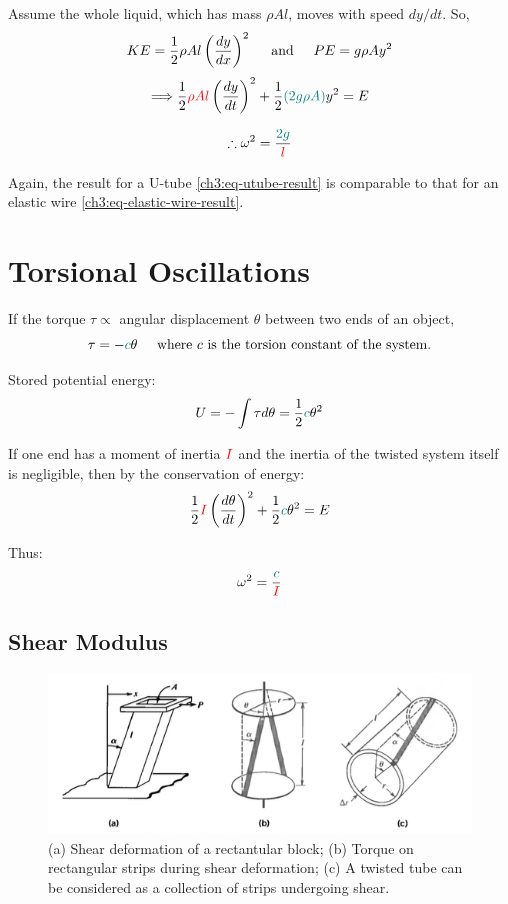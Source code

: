 Assume the whole liquid, which has mass $\rho Al$, moves with speed $dy/dt$. So,
\[ KE = \frac{1}{2} \rho Al \left(\frac{dy}{dx}\right)^2 \hspace{0.5cm}\text{and}\hspace{0.5cm}
PE = g\rho Ay^2 \]
\[ \Longrightarrow \frac{1}{2} \textcolor{red}{\rho Al} \left( \frac{dy}{dt} \right)^2 
+ \frac{1}{2} \textcolor{teal}{(2g\rho A)} y^2 = E  \] 

\begin{equation}
\therefore \omega^2 = \frac{\textcolor{teal}{2g}}{\textcolor{red}{l}} \label{ch3:eq-utube-result}
\end{equation}

Again, the result for a U-tube \eqref{ch3:eq-utube-result} is comparable to that for an elastic wire \eqref{ch3:eq-elastic-wire-result}.

\section{Torsional Oscillations} \label{ch3:sec-torsional}

If the torque $\tau \propto$ angular displacement $\theta$ between two ends of an object,
\[ \tau=-\textcolor{teal}{c}\theta \hspace{0.5cm}\text{where }\text{$c$ is the torsion constant of the system.} \]

Stored potential energy: \[ U= -\int \tau d\theta = \frac{1}{2} \textcolor{teal}{c}\theta^2 \]

If one end has a moment of inertia $\textcolor{red}{I}$ and the inertia of the twisted system itself is negligible, then by the conservation of energy:
\[ \frac{1}{2} \textcolor{red}{I} \left( \frac{d\theta}{dt}\right)^2 + \frac{1}{2} \textcolor{teal}{c}\theta^2 = E \]

Thus:
\begin{equation*}
\omega^2 = \frac{\textcolor{teal}{c}}{\textcolor{red}{I}}
\end{equation*}


\subsection{Shear Modulus}

\begin{figure}
	\centering
	\includegraphics[scale=0.55]{phys232/Ch3-shear-torsion.png}
	\caption{(a) Shear deformation of a rectantular block; (b) Torque on rectangular strips during shear deformation; (c) A twisted tube can be considered as a collection of strips undergoing shear.}
	\label{ch3:fig-shear-torsion}
\end{figure}

